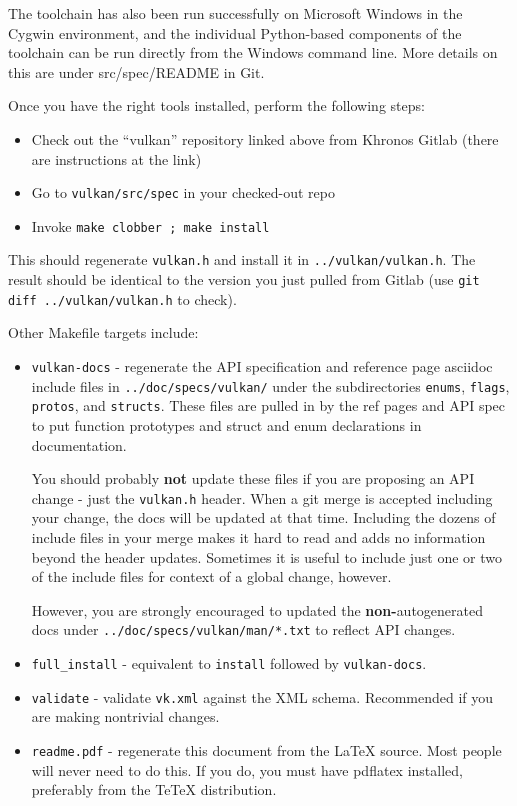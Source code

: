 \documentclass{article}
\def\code#1{{\tt #1}}
\begin{document}
The toolchain has also been run successfully on Microsoft Windows in the
Cygwin environment, and the individual Python-based components of the
toolchain can be run directly from the Windows command line. More details on
this are under src/spec/README in Git.

Once you have the right tools installed, perform the following steps:

\begin{itemize}
\item Check out the ``vulkan'' repository linked above from Khronos Gitlab
      (there are instructions at the link)
\item Go to \code{vulkan/src/spec} in your checked-out repo
\item Invoke \code{make clobber ; make install}
\end{itemize}

This should regenerate \code{vulkan.h} and install it in
\code{../vulkan/vulkan.h}. The result should be identical to the
version you just pulled from Gitlab (use \code{git diff
../vulkan/vulkan.h} to check).

Other Makefile targets include:

\begin{itemize}
\item \code{vulkan-docs} - regenerate the API specification and reference
      page asciidoc include files in \code{../doc/specs/vulkan/} under the
      subdirectories \code{enums}, \code{flags}, \code{protos}, and
      \code{structs}. These files are pulled in by the ref pages and API
      spec to put function prototypes and struct and enum declarations in
      documentation.

      You should probably {\bf not} update these files if you are proposing
      an API change - just the \code{vulkan.h} header. When a git merge is
      accepted including your change, the docs will be updated at that time.
      Including the dozens of include files in your merge makes it hard to
      read and adds no information beyond the header updates. Sometimes it
      is useful to include just one or two of the include files for context
      of a global change, however.

      However, you are strongly encouraged to updated the {\bf
      non-}autogenerated docs under \code{../doc/specs/vulkan/man/*.txt} to
      reflect API changes.
\item \code{full_install} - equivalent to \code{install} followed by
      \code{vulkan-docs}.
\item \code{validate} - validate \code{vk.xml} against the XML schema.
      Recommended if you are making nontrivial changes.
\item \code{readme.pdf} - regenerate this document from the LaTeX source.
      Most people will never need to do this. If you do, you must have
      pdflatex installed, preferably from the TeTeX distribution.
\end{itemize}
\end{document}
